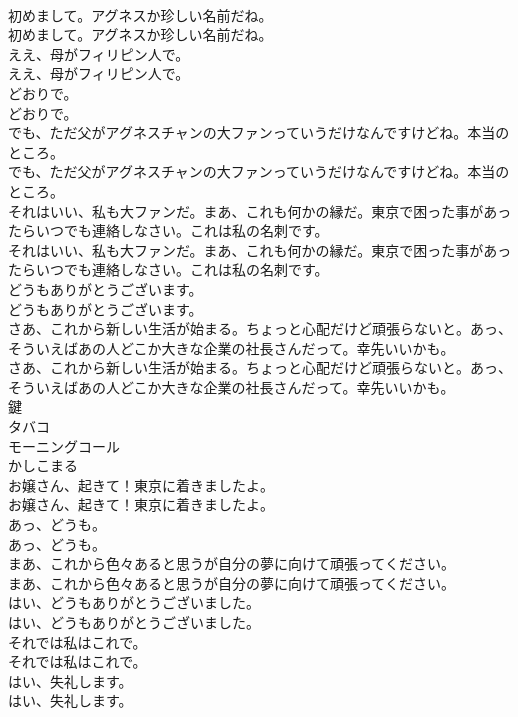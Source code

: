 \documentclass[8pt]{extreport}
\begin{document}
\begin{CJK}{UTF8}{min}
\\	初めまして。アグネスか珍しい名前だね。	
\\	初めまして。アグネスか珍しい名前だね。 
\\	ええ、母がフィリピン人で。	
\\	ええ、母がフィリピン人で。 
\\	どおりで。	
\\	どおりで。 
\\	でも、ただ父がアグネスチャンの大ファンっていうだけなんですけどね。本当のところ。	
\\	でも、ただ父がアグネスチャンの大ファンっていうだけなんですけどね。本当のところ。 
\\	それはいい、私も大ファンだ。まあ、これも何かの縁だ。東京で困った事があったらいつでも連絡しなさい。これは私の名刺です。	
\\	それはいい、私も大ファンだ。まあ、これも何かの縁だ。東京で困った事があったらいつでも連絡しなさい。これは私の名刺です。 
\\	どうもありがとうございます。	
\\	どうもありがとうございます。 
\\	さあ、これから新しい生活が始まる。ちょっと心配だけど頑張らないと。あっ、そういえばあの人どこか大きな企業の社長さんだって。幸先いいかも。	
\\	さあ、これから新しい生活が始まる。ちょっと心配だけど頑張らないと。あっ、そういえばあの人どこか大きな企業の社長さんだって。幸先いいかも。 
\\	鍵
\\	タバコ
\\	モーニングコール
\\	かしこまる
\\	お嬢さん、起きて！東京に着きましたよ。	
\\	お嬢さん、起きて！東京に着きましたよ。 
\\	あっ、どうも。	
\\	あっ、どうも。 
\\	まあ、これから色々あると思うが自分の夢に向けて頑張ってください。	
\\	まあ、これから色々あると思うが自分の夢に向けて頑張ってください。 
\\	はい、どうもありがとうございました。	
\\	はい、どうもありがとうございました。 
\\	それでは私はこれで。	
\\	それでは私はこれで。 
\\	はい、失礼します。	
\\	はい、失礼します。 

\end{CJK}
\end{document}
